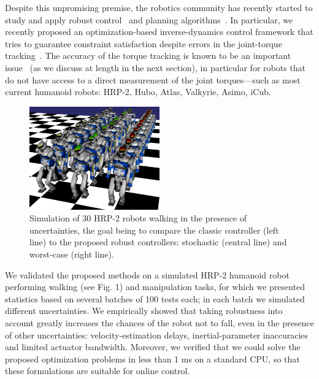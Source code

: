 Despite this unpromising premise, the robotics community has recently started to study and apply robust control~\citep{Brasseur2015, Nguyen} and planning algorithms~\citep{Luo, Mordatch2015}.
In particular, we recently proposed an optimization-based inverse-dynamics control framework that tries to guarantee constraint satisfaction despite errors in the joint-torque tracking~\citep{DelPrete2015b}.
The accuracy of the torque tracking is known to be an important issue~\citep{Boaventura2012b, DelPrete2015a} (as we discuss at length in the next section), in particular for robots that do not have access to a direct measurement of the joint torques---such as most current humanoid robots: HRP-2, Hubo, Atlas, Valkyrie, Asimo, iCub. 
\begin{figure}[htbp]
   \centering
   \includegraphics[width=0.5\textwidth]{figures/30_robots_walking.png} %
   \caption{Simulation of 30 HRP-2 robots walking in the presence of uncertainties, the goal being to compare the classic controller (left line) to the proposed robust controllers: stochastic (central line) and worst-case (right line).}
   \label{fig:robust_TSID}
\end{figure}
We validated the proposed methods on a simulated HRP-2 humanoid robot performing walking (see Fig. 1) and manipulation tasks, for which we presented statistics based on several batches of 100 tests each; in each batch we simulated different uncertainties.
We empirically showed that taking robustness into account greatly increases the chances of the robot not to fall, even in the presence of other uncertainties: velocity-estimation delays, inertial-parameter inaccuracies and limited actuator bandwidth. 
Moreover, we verified that we could solve the proposed optimization problems in less than 1 ms on a standard CPU, so that these formulations are suitable for online control.

